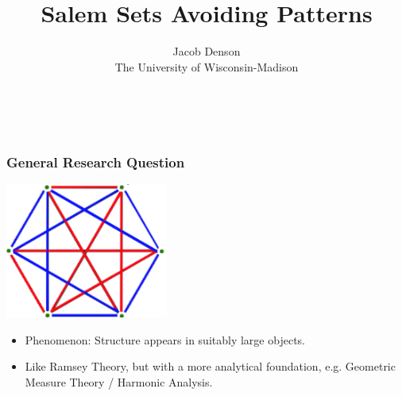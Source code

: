 \documentclass[usenames,dvipsnames,handout]{beamer}
\title{Salem Sets Avoiding Patterns}
\author{Jacob Denson\\The University of Wisconsin-Madison}
\institute{}
\begin{document}
\maketitle






\begin{frame}
    \ 
\end{frame}




\begin{frame}
    \frametitle{General Research Question}

    \begin{center}
    \includegraphics[width=0.4\textwidth]{../Images/RamseyTheory}
    \end{center}

    \begin{itemize}
        \item Phenomenon: Structure appears in suitably large objects.

        \item Like Ramsey Theory, but with a more analytical foundation, e.g. Geometric Measure Theory / Harmonic Analysis.
    \end{itemize}
\end{frame}
\end{document}
